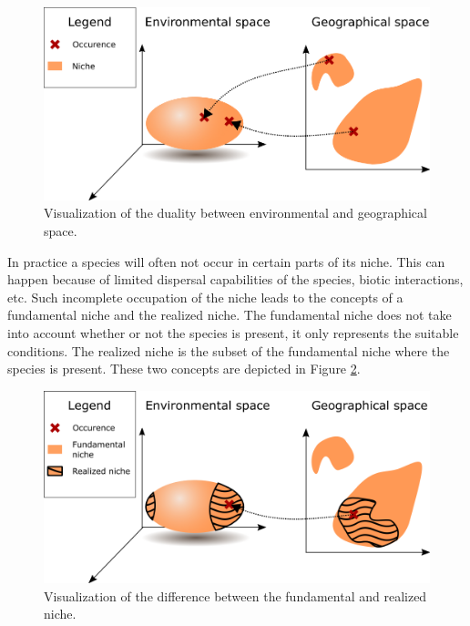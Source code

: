 \begin{figure}[!htb]
\includegraphics[scale=0.5]{VectorGraphics/Niche.png}
\caption{\label{fig:chTheEcologicalNicheConcept:Niche}Visualization of the duality between environmental and geographical space.}
\end{figure}

In practice a species will often not occur in certain parts of its niche. This can happen because of limited dispersal capabilities of the species, biotic interactions, etc. Such incomplete occupation of the niche leads to the concepts of a fundamental niche and the realized niche. The fundamental niche does not take into account whether or not the species is present, it only represents the suitable conditions. The realized niche is the subset of the fundamental niche where the species is present. These two concepts are depicted in Figure \ref{fig:chTheEcologicalNicheConcept:RealizedNiche}. 
\begin{figure}[!htb]
\includegraphics[scale=0.5]{VectorGraphics/RealizedNiche.png}
\caption{\label{fig:chTheEcologicalNicheConcept:RealizedNiche}Visualization of the difference between the fundamental and realized niche.}
\end{figure}


